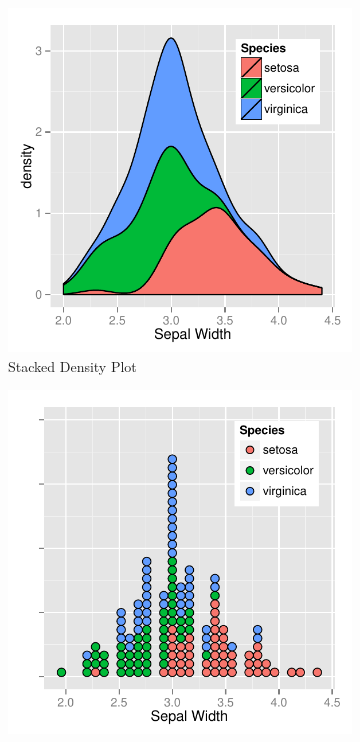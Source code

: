 \documentclass[11pt]{isuthesis}\usepackage[]{graphicx}\usepackage[]{color}
\begin{document}
\begin{figure}[htbp]\centering
\begin{subfigure}[b]{.33\textwidth}\centering
  \includegraphics[width=\textwidth]{fig-irisdatagrammar1}
  \caption{Stacked Density Plot}
\end{subfigure}\hfill
\begin{subfigure}[b]{.33\textwidth}\centering
  \includegraphics[width=\textwidth]{fig-irisdatagrammar2}

\end{subfigure}
\end{figure}
\end{document}
